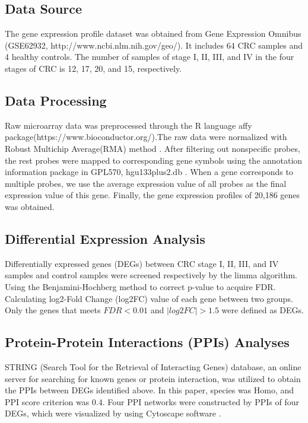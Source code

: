 \documentclass[utf8]{frontiersSCNS} %
\begin{document}
\subsection{Data Source}
The gene expression profile dataset was obtained
from Gene Expression Omnibus (GSE62932,
http://www.ncbi.nlm.nih.gov/geo/). It includes 64 CRC
samples and 4 healthy controls. The number of samples of
stage I, II, III, and IV in the four stages of CRC is 12, 17,
20, and 15, respectively.

\subsection{Data Processing}
Raw microarray data was preprocessed through the R language affy package(https://www.bioconductor.org/).The raw
data were normalized with Robust Multichip Average(RMA)
method \citep{irizarry2003exploration,gautier2004affy}. After filtering out nonspecific probes, the
rest probes were mapped to corresponding gene
symbols using the annotation information package in GPL570,
hgu133plus2.db \citep{carlson2016hgu133plus2}. When a gene corresponds to multiple
probes, we use the average expression value of all probes
as the final expression value of this gene. Finally, the gene
expression profiles of 20,186 genes was obtained.

\subsection{Differential Expression Analysis}
Differentially expressed genes (DEGs) between CRC stage
I, II, III, and IV samples and control samples were screened
respectively by the limma \citep{ritchie2015limma,smyth2005limma} algorithm. Using the
Benjamini-Hochberg \citep{ferreira2007benjamini} method to correct p-value to acquire FDR.
Calculating log2-Fold Change (log2FC) value of
each gene between two groups. Only the genes that meets
$FDR < 0.01$ and $|log2FC| > 1.5$ were defined as DEGs.

\subsection{Protein-Protein Interactions (PPIs) Analyses}
STRING (Search Tool for the Retrieval of Interacting
Genes) \citep{szklarczyk2014string} database, an online server for searching for known
genes or protein interaction, was utilized to obtain the PPIs
between DEGs identified above. In this paper, species was
Homo, and PPI score criterion was 0.4. Four PPI networks
were constructed by PPIs of four DEGs, which were visualized
by using Cytoscape software \citep{shannon2003cytoscape}.
\end{document}
